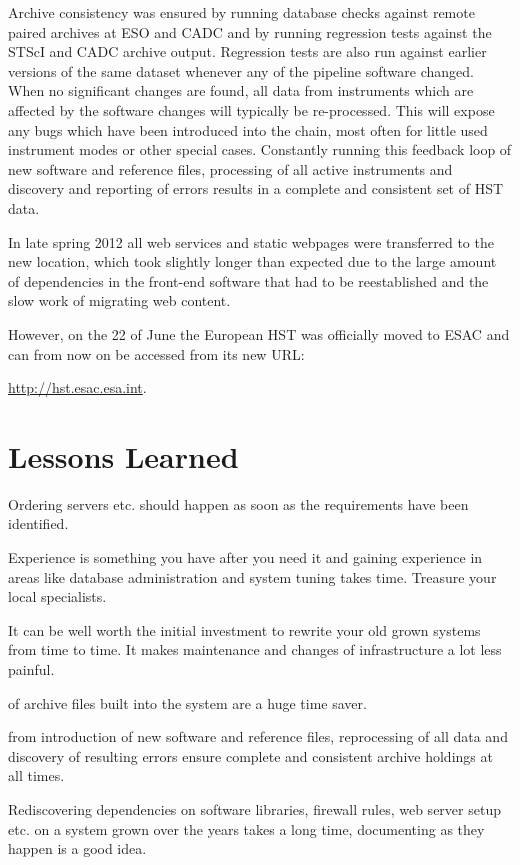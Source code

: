 \documentclass[11pt,twoside]{article}  %
\begin{document}
Archive consistency was  ensured by running 
database checks against remote paired archives at ESO and CADC 
and by running regression tests against the STScI and CADC archive output.
Regression tests are also run against earlier versions of the same dataset whenever any of the pipeline software changed. When no significant changes are found, all data from instruments which are affected by the software changes will typically be re-processed. This will expose any bugs which have been introduced into the chain, most often for little used instrument modes or other special cases.
Constantly  running this feedback loop of new software and reference files, processing of all active instruments and discovery and reporting of errors 
results in a complete and consistent set of HST data. 

In late spring 2012 all web services and static webpages were transferred to the new location, which took slightly longer than expected due to the large amount of dependencies in the front-end software that had to be reestablished and the slow work of migrating web content.

However, on the 22 of June the European HST was officially moved to ESAC and can from now on be accessed from its new URL: 

 \url{http://hst.esac.esa.int}.

\section{Lessons Learned}

\begin{description} \itemsep0pt 
\item[ Hardware procurement takes time.] Ordering servers etc. should happen as soon as the requirements have been identified.
\item[ Make sure the right skill set is at hand.] Experience is something you have after you need it and gaining experience in areas like database administration and system tuning takes time. Treasure your local specialists.
\item[ Flexible, lightweight and comprehensive archive software is a lifesaver] It can be well worth the initial investment to rewrite your old grown systems from time to time. It makes maintenance and changes of infrastructure a lot less painful.
\item[Automated synchronisation and re-ingestion ] of archive files built into the system are a huge time saver. 
\item[A closed loop] from introduction of new software and reference files, reprocessing of all data and discovery of resulting errors ensure complete and consistent archive holdings at all times.
\item[Document dependencies!] Rediscovering dependencies on software libraries, firewall rules, web server setup etc. on a system grown over the years takes a long time, documenting as they happen is a good idea. 
\end{description}
\end{document}
